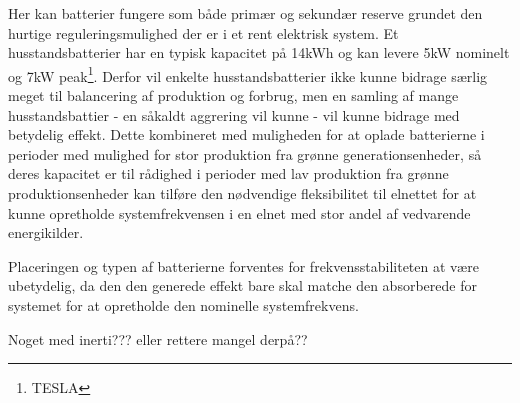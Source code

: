 Her kan batterier fungere som både primær og sekundær reserve grundet den hurtige reguleringsmulighed der er i et rent elektrisk system. Et husstandsbatterier har en typisk kapacitet på 14kWh og kan levere 5kW nominelt og 7kW peak\footnote{TESLA}. Derfor vil enkelte husstandsbatterier ikke kunne bidrage særlig meget til balancering af produktion og forbrug, men en samling af mange husstandsbattier - en såkaldt aggrering vil kunne - vil kunne bidrage med betydelig effekt. Dette kombineret med muligheden for at oplade batterierne i perioder med mulighed for stor produktion fra grønne generationsenheder, så deres kapacitet er til rådighed i perioder med lav produktion fra grønne produktionsenheder kan tilføre den nødvendige fleksibilitet til elnettet for at kunne opretholde systemfrekvensen i en elnet med stor andel af vedvarende energikilder.

Placeringen og typen af batterierne forventes for frekvensstabiliteten at være ubetydelig, da den den generede effekt bare skal matche den absorberede for systemet for at opretholde den nominelle systemfrekvens.

Noget med inerti??? eller rettere mangel derpå??



